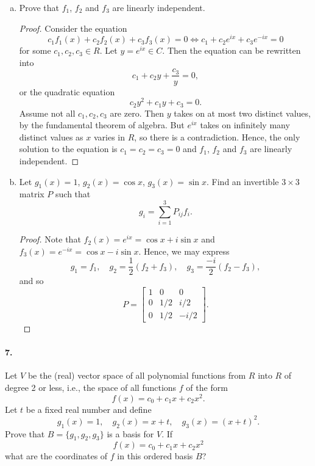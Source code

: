 \documentclass{article}
\begin{document}
\begin{enumerate}[(a)]
  \item Prove that $f_1$, $f_2$ and $f_3$ are linearly independent.
    \begin{proof}
      Consider the equation \[
        c_1f_1(x) + c_2f_2(x) + c_3f_3(x) = 0 \iff
        c_1 + c_2e^{ix} + c_3e^{-ix} = 0
      \] for some $c_1, c_2, c_3 \in R$. Let $y = e^{ix} \in C$. Then the
      equation can be rewritten into \[
        c_1 + c_2y + \frac{c_3}{y} = 0,
      \] or the quadratic equation \[
        c_2y^2 + c_1y + c_3 = 0.
      \] Assume not all $c_1, c_2, c_3$ are zero. Then $y$ takes on at most two
      distinct values, by the fundamental theorem of algebra. But $e^{ix}$ takes
      on infinitely many distinct values as $x$ varies in $R$, so there is a
      contradiction. Hence, the only solution to the equation is $c_1 = c_2 =
      c_3 = 0$ and $f_1$, $f_2$ and $f_3$ are linearly independent.
    \end{proof}

  \item Let $g_1(x) = 1$, $g_2(x) = \cos x$, $g_3(x) = \sin x$. Find an
    invertible $3 \times 3$ matrix $P$ such that \[
      g_i = \sum_{i=1}^3 P_{ij}f_i.
    \]
    \begin{proof}
      Note that $f_2(x) = e^{ix} = \cos x + i\sin x$ and $f_3(x) = e^{-ix} =
      \cos x - i\sin x$. Hence, we may express \[
        g_1 = f_1,\quad
        g_2 = \frac{1}{2}(f_2 + f_3),\quad
        g_3 = \frac{-i}{2}(f_2 - f_3),
      \] and so \[
        P = \begin{bmatrix}
          1 & 0 & 0 \\
          0 & 1/2 & i/2 \\
          0 & 1/2 & -i/2
        \end{bmatrix}.
      \]
    \end{proof}
\end{enumerate}

\paragraph{7.} Let $V$ be the (real) vector space of all polynomial functions
from $R$ into $R$ of degree 2 or less, i.e., the space of all functions $f$ of
the form \[
  f(x) = c_0 + c_1x + c_2x^2.
\] Let $t$ be a fixed real number and define \[
  g_1(x) = 1,\quad
  g_2(x) = x + t,\quad
  g_3(x) = (x + t)^2.
\] Prove that $B = \{g_1, g_2, g_3\}$ is a basis for $V$. If \[
  f(x) = c_0 + c_1x + c_2x^2
\] what are the coordinates of $f$ in this ordered basis $B$?
\end{document}
